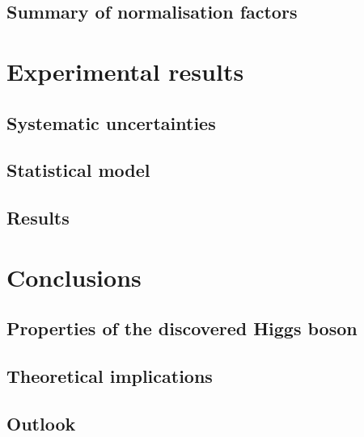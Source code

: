 \documentclass[hyper,linkcolor=blue]{mythesis}
\begin{document}
\begin{mainmatter}
    \section{Summary of normalisation factors}
      \label{sec:NFs}
      

  \chapter{Experimental results}
    \label{chap:results}
    
    \section{Systematic uncertainties}
      \label{sec:systematics}
      
    \section{Statistical model}
      \label{sec:stats}
      
    \clearpage
    \section{Results}
      \label{sec:results}
      

  \chapter{Conclusions}
    \label{chap:conclusions}
    
    \section{Properties of the discovered Higgs boson}
      \label{sec:searches}
      
    \section{Theoretical implications}
      \label{sec:implications}
      
    \section{Outlook}
      \label{sec:outlook}
      
\end{mainmatter}

\begin{backmatter}
  
  
\end{backmatter}
\end{document}
